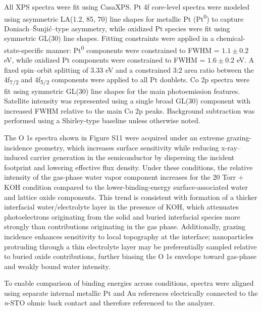 \documentclass[11pt]{article}
\begin{document}
All XPS spectra were fit using CasaXPS. Pt 4f core-level spectra were
modeled using asymmetric LA(1.2, 85, 70) line shapes for metallic Pt
(Pt\textsuperscript{0}) to capture Doniach--\v{S}unji\'c--type asymmetry, while oxidized Pt
species were fit using symmetric GL(30) line shapes. Fitting constraints
were applied in a chemical-state-specific manner: Pt\textsuperscript{0} components were
constrained to FWHM = $1.1 \pm 0.2$ eV, while oxidized Pt components were
constrained to FWHM = $1.6 \pm 0.2$ eV. A fixed spin--orbit splitting of
3.33 eV and a constrained 3:2 area ratio between the
4f\textsubscript{7/2} and 4f\textsubscript{5/2} components were applied
to all Pt doublets. Co 2p spectra were fit using symmetric GL(30) line
shapes for the main photoemission features. Satellite intensity was
represented using a single broad GL(30) component with increased FWHM
relative to the main Co 2p peaks. Background subtraction was performed
using a Shirley-type baseline unless otherwise noted.

The O 1s spectra shown in Figure S11 were acquired under an extreme
grazing-incidence geometry, which increases surface sensitivity while
reducing x-ray--induced carrier generation in the semiconductor by
dispersing the incident footprint and lowering effective flux density.
Under these conditions, the relative intensity of the gas-phase water
vapor component increases for the 20 Torr + KOH condition compared to
the lower-binding-energy surface-associated water and lattice oxide
components. This trend is consistent with formation of a thicker
interfacial water/electrolyte layer in the presence of KOH, which
attenuates photoelectrons originating from the solid and buried
interfacial species more strongly than contributions originating in the
gas phase. Additionally, grazing incidence enhances sensitivity to local
topography at the interface; nanoparticles protruding through a thin
electrolyte layer may be preferentially sampled relative to buried oxide
contributions, further biasing the O 1s envelope toward gas-phase and
weakly bound water intensity.

To enable comparison of binding energies across conditions, spectra were
aligned using separate internal metallic Pt and Au references
electrically connected to the \emph{n}-STO ohmic back contact and
therefore referenced to the analyzer.
\end{document}

